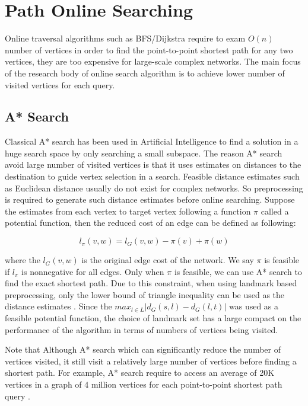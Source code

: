 \section{Path Online Searching}
\label{path}

Online traversal algorithms such as BFS/Dijkstra require to exam $O(n)$ number of vertices in order to find the point-to-point shortest path for any two vertices, they are too expensive for large-scale complex networks. The main focus of the research body of online search algorithm is to achieve lower number of visited vertices for each query.

\subsection{A* Search}

Classical A* search has been used in Artificial Intelligence to find a solution in a huge search space by only searching a small subspace. The reason A* search avoid large number of visited vertices is that it uses estimates on distances to the destination to guide vertex selection in a search. Feasible distance estimates such as Euclidean distance usually do not exist for complex networks. So preprocessing is required to generate such distance estimates before online searching. Suppose the estimates from each vertex to target vertex following a function $\pi$ called a potential function, then the reduced cost of an edge can be defined as following:

\[
    l_{\pi}(v,w) = l_G(v,w) - \pi(v) + \pi(w)
\]

where the $l_G(v,w)$ is the original edge cost of the network. We say $\pi$ is feasible if $l_{\pi}$ is nonnegative for all edges. Only when $\pi$ is feasible, we can use A* search to find the exact shortest path. Due to this constraint, when using landmark based preprocessing, only the lower bound of triangle inequality can be used as the distance estimates \cite{Goldberg:2005:CSP:1070432.1070455}. Since the $max_{l \in L}|d_G(s,l)-d_G(l,t)|$ was used as a feasible potential function, the choice of landmark set has a large compact on the performance of the algorithm in terms of numbers of vertices being visited.

Note that Although A* search which can significantly reduce the number of vertices visited, it still visit a relatively large number of vertices before finding a shortest path. For example, A* search require to access an average of 20K vertices in a graph of 4 million vertices for each point-to-point shortest path query \cite{Potamias:2009:FSP:1645953.1646063}.    

